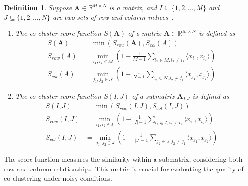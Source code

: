 \documentclass[journal]{IEEEtran}
\newtheorem{definition}{Definition}
\renewcommand{\cite}[1]{~\autocite{#1}}
\begin{document}
\begin{definition}
  Suppose $\mathbf{A} \in \mathbb{R}^{M \times N}$ is a matrix, and $I \subseteq \{1, 2, \ldots, M\}$ and $J \subseteq \{1, 2, \ldots, N\}$ are two sets of row and column indices\cite{zhao2016IdentifyingMultidimensionalCoclusters}.
  \label{def:co_cluster_score}
  \begin{enumerate}
    \item The co-cluster score function $S(\mathbf{A})$ of a matrix $\mathbf{A} \in \mathbb{R}^{M \times N}$ is defined as
          \begin{equation}
            \begin{split}
              S(\mathbf{A}) & = \min(S_{row}(\mathbf{A}), S_{col}(A))                                                                               \\
              S_{row}(A)    & = \min_{i_1, i_2 \in M} \left(1- \frac{1}{M-1} \sum_{i_2 \in M, i_2 \neq i_1} \langle x_{i_1}, x_{i_2}\rangle \right) \\
              S_{col}(A)    & = \min_{j_1, j_2 \in N} \left(1- \frac{1}{N-1} \sum_{j_2 \in N, j_2 \neq j_1} \langle x_{j_1}, x_{j_2}\rangle \right)
            \end{split}
          \end{equation}
    \item The co-cluster score function $S(I,J)$ of a submatrix $\mathbf{A}_{I,J}$ is defined as
          \begin{equation}
            \begin{split}
              S(I,J)       & = \min(S_{row}(I,J), S_{col}(I,J))                                                                                      \\
              S_{row}(I,J) & = \min_{i_1, i_2 \in I} \left(1- \frac{1}{|I|-1} \sum_{i_2 \in I, i_2 \neq i_1} \langle x_{i_1}, x_{i_2}\rangle \right) \\
              S_{col}(I,J) & = \min_{j_1, j_2 \in J} \left(1- \frac{1}{|J|-1} \sum_{j_2 \in J, j_2 \neq j_1} \langle x_{j_1}, x_{j_2}\rangle \right)
            \end{split}
          \end{equation}
  \end{enumerate}
\end{definition}

The score function measures the similarity within a submatrix, considering both row and column relationships. This metric is crucial for evaluating the quality of co-clustering under noisy conditions.
\end{document}
